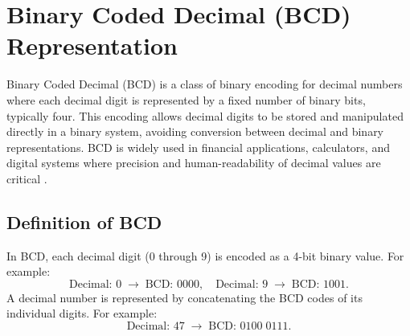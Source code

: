 \section{Binary Coded Decimal (BCD) Representation}
Binary Coded Decimal (BCD) is a class of binary encoding for decimal numbers where each decimal digit is represented by a fixed number of binary bits, typically four. This encoding allows decimal digits to be stored and manipulated directly in a binary system, avoiding conversion between decimal and binary representations. BCD is widely used in financial applications, calculators, and digital systems where precision and human-readability of decimal values are critical \cite{Hennessy19, stallings2020}.

\subsection{Definition of BCD}
In BCD, each decimal digit (0 through 9) is encoded as a 4-bit binary value. For example:
\[
\text{Decimal: } 0 \; \rightarrow \; \text{BCD: } 0000, \quad \text{Decimal: } 9 \; \rightarrow \; \text{BCD: } 1001.
\]
A decimal number is represented by concatenating the BCD codes of its individual digits. For example:
\[
\text{Decimal: } 47 \; \rightarrow \; \text{BCD: } 0100 \; 0111.
\]

